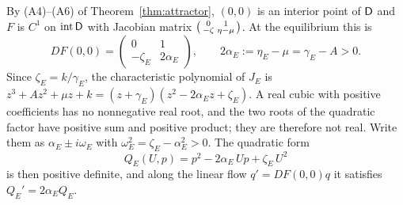 By (A4)--(A6) of Theorem~\ref{thm:attractor}, $(0,0)$ is an interior point of $\mathsf D$ and $F$ is $C^1$ on $\operatorname{int}\mathsf D$ with Jacobian matrix $\begin{psmallmatrix}0&1\\-\zeta&\eta-\mu\end{psmallmatrix}$. At the equilibrium this is
\[
DF(0,0)=\begin{pmatrix}0&1\\-\zeta_E&2\alpha_E\end{pmatrix},\qquad 2\alpha_E:=\eta_E-\mu=\gamma_E-A>0 .
\]
Since $\zeta_E=k/\gamma_E$, the characteristic polynomial of $J_E$ is $z^3+Az^2+\mu z+k=(z+\gamma_E)(z^2-2\alpha_Ez+\zeta_E)$. A real cubic with positive coefficients has no nonnegative real root, and the two roots of the quadratic factor have positive sum and positive product; they are therefore not real. Write them as $\alpha_E\pm i\omega_E$ with $\omega_E^2=\zeta_E-\alpha_E^2>0$. The quadratic form
\begin{equation}\label{neg:eq:QE}
Q_E(U,p)=p^2-2\alpha_E\,Up+\zeta_E\,U^2
\end{equation}
is then positive definite, and along the linear flow $q'=DF(0,0)q$ it satisfies $Q_E'=2\alpha_EQ_E$.

